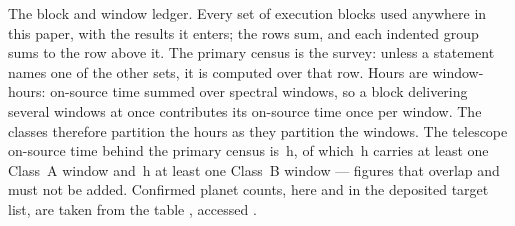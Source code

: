 \begin{table}
\centering
\scriptsize
\caption{The block and window ledger. Every set of execution blocks used
anywhere in this paper, with the results it enters; the rows sum, and each
indented group sums to the row above it. The primary census is the survey:
unless a statement names one of the other sets, it is computed over that row.
Hours are window-hours: on-source time summed over spectral windows, so a
block delivering several windows at once contributes its on-source time
once per window. The classes therefore partition the hours as they
partition the windows. The telescope on-source time behind the primary
census is \StTelHours\,h, of which \StTelHoursFine\,h carries at least
one Class~A window and \StTelHoursCoarse\,h at least one Class~B window
--- figures that overlap and must not be added. Confirmed planet counts, here and in the deposited
target list, are taken from the \SfHostCatalogue{} \SfHostTable{} table
\citep{NEA2013}, accessed \SfHostDate.}
\label{tab:blockledger}

\end{table}

